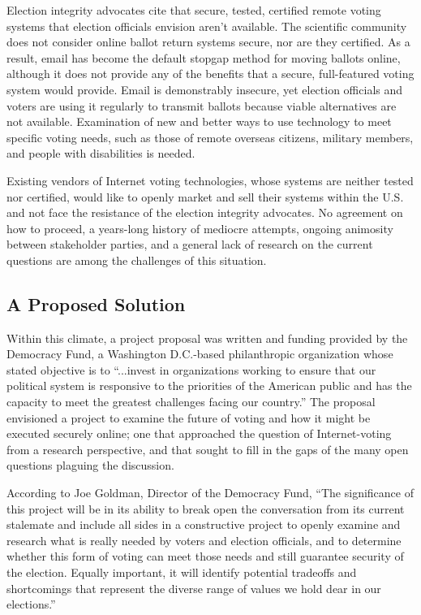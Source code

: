 Election integrity advocates cite that secure, tested, certified
remote voting systems that election officials envision aren’t
available. The scientific community does not consider online ballot
return systems secure, nor are they certified. As a result, email has
become the default stopgap method for moving ballots online, although
it does not provide any of the benefits that a secure, full-featured
voting system would provide. Email is demonstrably insecure, yet
election officials and voters are using it regularly to transmit
ballots because viable alternatives are not available. Examination of
new and better ways to use technology to meet specific voting needs,
such as those of remote overseas citizens, military members, and
people with disabilities is needed.

Existing vendors of Internet voting technologies, whose systems are
neither tested nor certified, would like to openly market and sell
their systems within the U.S. and not face the resistance of the
election integrity advocates. No agreement on how to proceed, a
years-long history of mediocre attempts, ongoing animosity between
stakeholder parties, and a general lack of research on the current
questions are among the challenges of this situation.

\subsection{A Proposed Solution}
\label{sec:proposed-solution}

Within this climate, a project proposal was written and funding
provided by the Democracy Fund, a Washington D.C.-based philanthropic
organization whose stated objective is to “...invest in organizations
working to ensure that our political system is responsive to the
priorities of the American public and has the capacity to meet the
greatest challenges facing our country.” The proposal envisioned a
project to examine the future of voting and how it might be executed
securely online; one that approached the question of Internet-voting
from a research perspective, and that sought to fill in the gaps of
the many open questions plaguing the discussion.

According to Joe Goldman, Director of the Democracy Fund, “The
significance of this project will be in its ability to break open the
conversation from its current stalemate and include all sides in a
constructive project to openly examine and research what is really
needed by voters and election officials, and to determine whether this
form of voting can meet those needs and still guarantee security of
the election. Equally important, it will identify potential tradeoffs
and shortcomings that represent the diverse range of values we hold
dear in our elections.”

